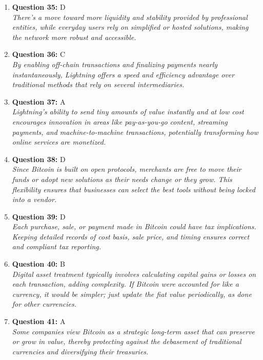 \documentclass[12pt,a4paper]{article}
\begin{document}
\begin{enumerate}
\item \textbf{Question 35:} D
\\ \textit{There’s a move toward more liquidity and stability provided by professional entities, while everyday users rely on simplified or hosted solutions, making the network more robust and accessible.}

\item \textbf{Question 36:} C
\\ \textit{By enabling off-chain transactions and finalizing payments nearly instantaneously, Lightning offers a speed and efficiency advantage over traditional methods that rely on several intermediaries.}

\item \textbf{Question 37:} A
\\ \textit{Lightning’s ability to send tiny amounts of value instantly and at low cost encourages innovation in areas like pay-as-you-go content, streaming payments, and machine-to-machine transactions, potentially transforming how online services are monetized.}

\item \textbf{Question 38:} D
\\ \textit{Since Bitcoin is built on open protocols, merchants are free to move their funds or adopt new solutions as their needs change or they grow. This flexibility ensures that businesses can select the best tools without being locked into a vendor.}

\item \textbf{Question 39:} D
\\ \textit{Each purchase, sale, or payment made in Bitcoin could have tax implications. Keeping detailed records of cost basis, sale price, and timing ensures correct and compliant tax reporting.}

\item \textbf{Question 40:} B
\\ \textit{Digital asset treatment typically involves calculating capital gains or losses on each transaction, adding complexity. If Bitcoin were accounted for like a currency, it would be simpler; just update the fiat value periodically, as done for other currencies.}

\item \textbf{Question 41:} A
\\ \textit{Some companies view Bitcoin as a strategic long-term asset that can preserve or grow in value, thereby protecting against the debasement of traditional currencies and diversifying their treasuries.}


\end{enumerate}
\end{document}
